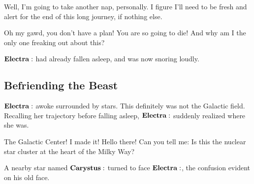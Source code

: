 \Electra Well, I'm going to take another nap, personally.  I figure I'll need to be fresh and alert for the end of this long journey, if nothing else.

\Dardanus Oh my gawd, you don't have a plan!  You are so going to die!  And why am I the only one freaking out about this?

$\Electra$ had already fallen asleep, and was now snoring loudly.

\subsection{Befriending the Beast} \label{beast}

$\Electra$ awoke surrounded by stars.  This definitely was not the Galactic field.  Recalling her trajectory before falling asleep, $\Electra$ suddenly realized where she was.

\Electra The Galactic Center!  I made it!  Hello there!  Can you tell me:  Is this the nuclear star cluster at the heart of the Milky Way?

A nearby star named $\Carystus$ turned to face $\Electra$, the confusion evident on his old face.  


